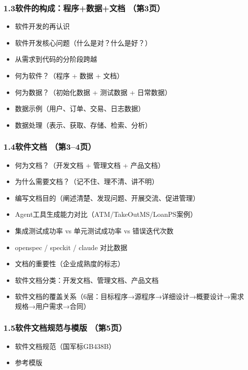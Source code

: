 \documentclass[12pt,a4paper]{ctexart}
\begin{document}
\subsubsection{1.3\quad 软件的构成：程序+数据+文档 \hfill（第3页）}
\begin{itemize}
    \item 软件开发的再认识
    \item 软件开发核心问题（什么是对？什么是好？）
    \item 从需求到代码的分阶段跨越
    \item 何为软件？（程序 + 数据 + 文档）
    \item 何为数据？（初始化数据 + 测试数据 + 日常数据）
    \item 数据示例（用户、订单、交易、日志数据）
    \item 数据处理（表示、获取、存储、检索、分析）
\end{itemize}

\subsubsection{1.4\quad 软件文档 \hfill（第3--4页）}
\begin{itemize}
    \item 何为文档？（开发文档 + 管理文档 + 产品文档）
    \item 为什么需要文档？（记不住、理不清、讲不明）
    \item 编写文档目的（阐述清楚、发现问题、开展交流、促进管理）
    \item Agent工具生成能力对比（ATM/TakeOutMS/LoanPS案例）
    \item 集成测试成功率 vs 单元测试成功率 vs 错误迭代次数
    \item openspec / speckit / claude 对比数据
    \item 文档的重要性（企业成熟度的标志）
    \item 软件文档分类：开发文档、管理文档、产品文档
    \item 软件文档的覆盖关系（6层：目标程序→源程序→详细设计→概要设计→需求规格→用户需求→合同）
\end{itemize}

\subsubsection{1.5\quad 软件文档规范与模版 \hfill（第5页）}
\begin{itemize}
    \item 软件文档规范（国军标GB438B）
    \item 参考模版
\end{itemize}
\end{document}
